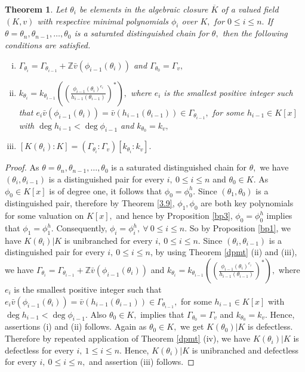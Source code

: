 \documentclass[11pt]{amsart}
\newtheorem{theorem}{Theorem}[section]
\theoremstyle{definition}
\theoremstyle{remark}
\numberwithin{equation}{section}
\begin{document}
		
		\begin{theorem}\label{dpth3}
			Let $\theta_i$ be elements in the algebraic  closure $\overline{K}$ of a valued field $(K,v)$ with respective minimal polynomials $\phi_i$ over $K,$ for $0\leq i\leq n.$ If $\theta=\theta_n, \theta_{n-1},\ldots, \theta_0$ is a saturated distinguished chain for $\theta,$ then the following conditions are satisfied.
			\begin{enumerate}[(i)]
				\item $\Gamma_{\theta_i}=\Gamma_{\theta_{i-1}}+\mathbb{Z}\bar{v}(\phi_{i-1}(\theta_i))$ and $\Gamma_{\theta_0}=\Gamma_v,$
				\item $k_{\theta_i}=k_{\theta_{i-1}}\left(\left(\frac{\phi_{i-1}(\theta_i)^{e_i}}{h_{i-1}(\theta_{i-1})}\right)^*\right),$ where $e_i$ is the smallest positive integer such that $e_i\bar{v}(\phi_{i-1}(\theta_i))=\bar{v}(h_{i-1}(\theta_{i-1}))\in \Gamma_{\theta_{i-1}},$ for some $h_{i-1}\in K[x]$ with $\deg h_{i-1}<\deg \phi_{i-1}$ and $k_{\theta_0}=k_v,$
				\item $[K(\theta_i):K]=(\Gamma_{\theta_i}:\Gamma_v)[k_{\theta_i}:k_v].$
			\end{enumerate}
		\end{theorem}
		\begin{proof}
			As $\theta=\theta_n, \theta_{n-1},\ldots, \theta_0$ is a saturated distinguished chain for $\theta,$ we have $(\theta_i,\theta_{i-1})$ is a distinguished pair for every $i,\ 0\leq i\leq n$ and  $\theta_0\in K.$  As $\phi_0\in K[x]$ is of degree one, it follows that $\phi_0=\phi_0^h.$ Since $(\theta_1,\theta_0)$ is a distinguished pair, therefore by Theorem \ref{3.9}, $\phi_1, \phi_0$ are both key polynomials for some valuation on $K[x],$ and hence by Proposition \ref{bp3}, $\phi_0=\phi_0^h$ implies that $\phi_1=\phi_1^h.$ Consequently, $\phi_i=\phi_i^h,\ \forall \ 0\leq i \leq n.$ So by Proposition \ref{bp1}, we have $K(\theta_i)|K$ is unibranched for every $i,\ 0\leq i\leq n.$  Since $(\theta_i,\theta_{i-1})$ is a distinguished pair for every $i,\ 0\leq i\leq n$, by using Theorem \ref{dpmt} (ii) and (iii), we have $\Gamma_{\theta_i}=\Gamma_{\theta_{i-1}}+\mathbb{Z}\bar{v}(\phi_{i-1}(\theta_i))$ and 
			$k_{\theta_i}=k_{\theta_{i-1}}\left(\left(\frac{\phi_{i-1}(\theta_i)^{e_i}}{h_{i-1}(\theta_{i-1})}\right)^*\right),$ where $e_i$ is the smallest positive integer such that $e_i\bar{v}(\phi_{i-1}(\theta_i))=\bar{v}(h_{i-1}(\theta_{i-1}))\in \Gamma_{\theta_{i-1}},$ for some $h_{i-1}\in K[x]$ with $\deg h_{i-1}<\deg \phi_{i-1}$. Also $\theta_0\in K,$ implies that $\Gamma_{\theta_0}=\Gamma_v$ and $k_{\theta_0}=k_v.$ Hence, assertions (i) and (ii) follows. Again as $\theta_0\in K,$ we get $K(\theta_0)|K$ is defectless. Therefore by repeated application of Theorem \ref{dpmt} (iv), we have $K(\theta_i)|K$ is defectless for every $i,\ 1\leq i\leq n.$ Hence, $K(\theta_i)|K$ is unibranched and defectless for every $i,\ 0\leq i\leq n,$ and assertion (iii) follows.
		\end{proof}
	
\end{document}
